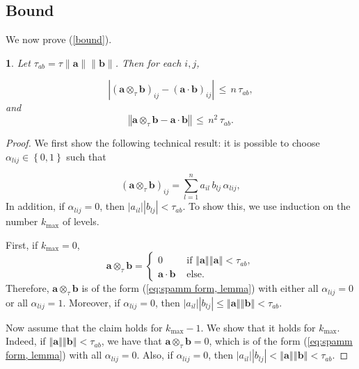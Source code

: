\documentclass[letterpaper,twocolumn,amsmath,amsfont,amssymb,english,aps,jcp,preprintnumbers,groupaddress,nofootinbib,tightenlines,floatfix]{revtex4}
\newcommand{\mat}[1]{\boldsymbol{#1}}
\newcommand{\ot}{  {\scriptstyle \otimes}_{ \tau } }
\theoremstyle{plain}
\theoremstyle{remark}
\theoremstyle{plain}
\newtheorem{prop}[thm]{\protect\propositionname}
\providecommand{\propositionname}{Proposition}
\begin{document}
\subsection{Bound}

We now prove (\ref{bound}).

\begin{prop}
\label{lem:SpAMM mult, prop}
Let $\tau_{ab} = \tau \| \mat{a} \| \| \mat{b} \| $. Then for each $i,j$,

\[
\left|\left(\mat{a}\ot \mat{b}\right)_{ij}-\left( \mat{a} \cdot \mat{b} \right)_{ij}\right| \, \leq \, n \,  \tau_{ab},
\]
and
\[
\left\Vert \mat{a} \ot \mat{b}- \mat{a} \cdot \mat{b} \right\Vert \, \leq  \, n^{2} \,\tau_{ab}.
\]
\end{prop}

\begin{proof}


We first show the following technical result: it is possible to choose $\alpha_{lij}\in\left\{ 0,1\right\} $ such that 

\begin{equation}
\left( \mat{a} \ot \mat{b}\right)_{ij}=\sum_{l=1}^{n}a_{il}\, b_{lj} \, \alpha_{lij},\label{eq:spamm form, lemma}
\end{equation}
In addition, if $\alpha_{lij}=0$, then \textup{$\left|a_{il}\right|\left|b_{lj}\right|<\tau_{ab}$}. To show this, we use 
induction on the number $k_{\max}$ of levels. 

First, if $k_{\max}=0$,
\[
\mat{a} \ot \mat{b}=\begin{cases}
0 & \,\,\text{if}\,\,\left\Vert \mat{a} \right\Vert \left\Vert \mat{a} \right\Vert <\tau_{ab},\\
\mat{a} \cdot \mat{b} & \,\,\text{else}.
\end{cases}
\]
Therefore, $\mat{a}\ot \mat{b}$ is of the form (\ref{eq:spamm form, lemma})
with either all $\alpha_{lij}=0$ or all $\alpha_{lij}=1$. Moreover,
if $\alpha_{lij}=0$, then $\left|a_{il}\right|\left| b_{lj}\right|\leq\left\Vert \mat{a} \right\Vert 
 \left\Vert \mat{b}\right\Vert <\tau_{ab}$. 

Now assume that the claim holds for $k_{\max}-1$. We show that it
holds for $k_{\max}$. Indeed, if $\left\Vert \mat{a} \right\Vert \left\Vert \mat{b} \right\Vert < \tau_{ab}$,
we have that $\mat{a} \ot \mat{b}=0$, which is of the form (\ref{eq:spamm form, lemma})
with all $\alpha_{lij}=0$. Also, if $\alpha_{lij}=0$, then $\left| a_{il}\right|\left|b_{lj}\right|
<\left\Vert \mat{a}\right\Vert \left\Vert\mat{b}\right\Vert <\tau_{ab}$.


\end{proof}
\end{document}
